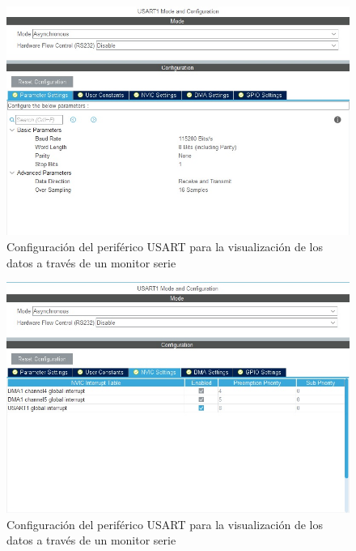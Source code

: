 \documentclass[10pt,a4paper,oneside]{article}
\begin{document}
\begin{figure}[H]
\centering
\includegraphics[scale=0.5]{Imagenes/Usart_cfg1.jpg}
\caption[Configuración del periférico USART para la visualización de los datos a través de un monitor serie]{Configuración del periférico USART para la visualización de los datos a través de un monitor serie}
\label{fig:007}
\end{figure}

\begin{figure}[H]
\centering
\includegraphics[scale=0.5]{Imagenes/Usart_cfg2.jpg}
\caption[Configuración del periférico USART para la visualización de los datos a través de un monitor serie]{Configuración del periférico USART para la visualización de los datos a través de un monitor serie}
\label{fig:008}
\end{figure}
\end{document}
